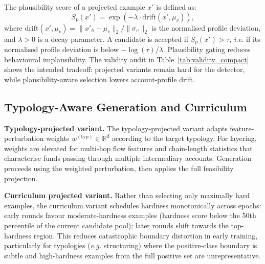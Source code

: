 \documentclass[sigconf,review,anonymous]{acmart}
\newcommand{\eg}{\textit{e.g.}\xspace}
\newcommand{\ie}{\textit{i.e.}\xspace}
\begin{document}
The plausibility score of a projected example $x'$ is defined as:
\begin{equation}
  S_p(x') = \exp\!\left(-\lambda \cdot \text{drift}(x', \mu_v)\right),
  \label{eq:plausibility}
\end{equation}
where $\text{drift}(x', \mu_v) = \|x'_h - \mu_v\|_2 / \|\sigma_v\|_2$
is the normalised profile deviation, and $\lambda > 0$ is a decay
parameter. A candidate is accepted if $S_p(x') > \tau$, \ie if its
normalised profile deviation is below $-\log(\tau)/\lambda$.
Plausibility gating reduces behavioural implausibility. The validity audit in
Table~\ref{tab:validity_compact} shows the intended tradeoff: projected
variants remain hard for the detector, while plausibility-aware selection
lowers account-profile drift.

\subsection{Typology-Aware Generation and Curriculum}
\label{subsec:typology}

\textbf{Typology-projected variant.}
The typology-projected variant adapts feature-perturbation weights
$w^{(\text{typ})} \in \mathbb{R}^d$ according to the target typology.
For layering, weights are elevated for multi-hop flow features and
chain-length statistics that characterise funds passing through
multiple intermediary accounts. Generation proceeds using the
weighted perturbation, then applies the full feasibility projection.

\textbf{Curriculum projected variant.}
Rather than selecting only maximally hard examples, the curriculum variant
schedules hardness monotonically across epochs: early rounds favour
moderate-hardness examples (hardness score below the 50th percentile of
the current candidate pool); later rounds shift towards the top-hardness
region. This reduces catastrophic boundary distortion in early training,
particularly for typologies (\eg structuring) where the positive-class
boundary is subtle and high-hardness examples from the full positive set
are unrepresentative.
\end{document}
